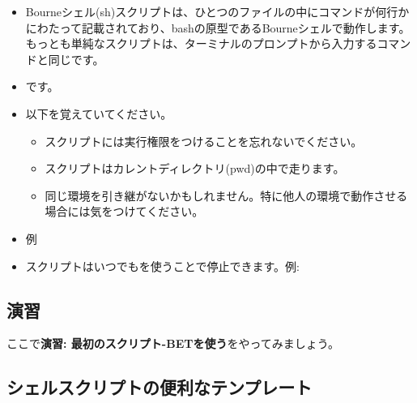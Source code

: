 \documentclass{jsarticle}
\begin{document}
\begin{itemize}
\item Bourneシェル(sh)スクリプトは、ひとつのファイルの中にコマンドが何行かにわたって記載されており、bashの原型であるBourneシェルで動作します。もっとも単純なスクリプトは、ターミナルのプロンプトから入力するコマンドと同じです。
\item {\color{red}{\bf shスクリプトの最初の行は必ず}} {\color{red}{\tt \#!/bin/sh}}です。
\item 以下を覚えていてください。
	\begin{itemize}
	\item スクリプトには実行権限をつけることを忘れないでください。

	{\color{red}}

	\item スクリプトはカレントディレクトリ(pwd)の中で走ります。
	\item 同じ環境を引き継がないかもしれません。特に他人の環境で動作させる場合には気をつけてください。
	\end{itemize}

\item 例

{\color{red}{\tt
\#!/bin/sh

bet im1 im1\_brain -m

mv im1\_brain\_mask.nii.gz mask1.nii.gz
}} 

\item スクリプトはいつでも{\color{red}}を使うことで停止できます。例: {\color{red}}

\end{itemize}



\subsection*{演習}

ここで{\bf 演習: 最初のスクリプト-BETを使う}をやってみましょう。


\subsection{シェルスクリプトの便利なテンプレート}
\end{document}
